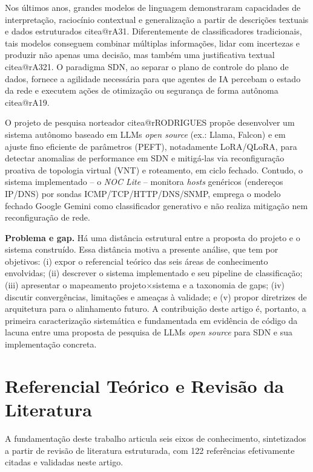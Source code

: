 \documentclass[12pt,a4paper]{article}
\makeatletter
\newcommand{\citea}[1]{\begingroup\edef\@currentlabel{\csname citea@#1\endcsname}\@currentlabel\endgroup}
\makeatother
\begin{document}
Nos últimos anos, grandes modelos de linguagem demonstraram capacidades de
interpretação, raciocínio contextual e generalização a partir de descrições
textuais e dados estruturados \citea{rA31}. Diferentemente de classificadores
tradicionais, tais modelos conseguem combinar múltiplas informações, lidar com
incertezas e produzir não apenas uma decisão, mas também uma justificativa
textual \citea{rA321}. O paradigma SDN, ao separar o plano de controle do plano de
dados, fornece a agilidade necessária para que agentes de IA percebam o estado
da rede e executem ações de otimização ou segurança de forma autônoma \citea{rA19}.

O projeto de pesquisa norteador \citea{rRODRIGUES} propõe desenvolver um sistema
autônomo baseado em LLMs \textit{open source} (ex.: Llama, Falcon) e em
ajuste fino eficiente de parâmetros (PEFT), notadamente LoRA/QLoRA, para
detectar anomalias de performance em SDN e mitigá-las via reconfiguração
proativa de topologia virtual (VNT) e roteamento, em ciclo fechado. Contudo, o
sistema implementado -- o \textit{NOC Lite} -- monitora \textit{hosts}
genéricos (endereços IP/DNS) por sondas ICMP/TCP/HTTP/DNS/SNMP, emprega o
modelo fechado Google Gemini como classificador generativo e não realiza
mitigação nem reconfiguração de rede.

\textbf{Problema e gap.} Há uma distância estrutural entre a proposta do
projeto e o sistema construído. Essa distância motiva a presente análise, que
tem por objetivos: (i) expor o referencial teórico das seis áreas de
conhecimento envolvidas; (ii) descrever o sistema implementado e seu pipeline
de classificação; (iii) apresentar o mapeamento projeto$\times$sistema e a
taxonomia de gaps; (iv) discutir convergências, limitações e ameaças à
validade; e (v) propor diretrizes de arquitetura para o alinhamento futuro.
A contribuição deste artigo é, portanto, a primeira caracterização
sistemática e fundamentada em evidência de código da lacuna entre uma proposta
de pesquisa de LLMs \textit{open source} para SDN e sua implementação
concreta.

\section{Referencial Teórico e Revisão da Literatura}
\label{sec:referencial}

A fundamentação deste trabalho articula seis eixos de conhecimento, sintetizados
a partir de revisão de literatura estruturada, com 122 referências efetivamente
citadas e validadas neste artigo.
\end{document}
